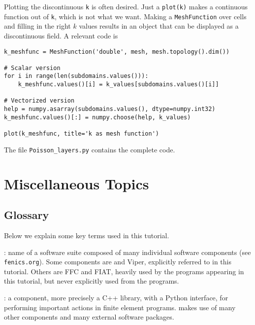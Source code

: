 Plotting the discontinuous {\fontsize{12pt}{12pt}\texttt{k}} is often desired. Just a {\fontsize{12pt}{12pt}\texttt{plot(k)}}
makes a continuous function out of {\fontsize{12pt}{12pt}\texttt{k}}, which is not what we want.
Making a {\fontsize{12pt}{12pt}\texttt{MeshFunction}} over cells and filling in the right $k$
values results in an object that can be displayed as a discontinuous field.
A relevant code is
\begin{Verbatim}[fontsize=\fontsize{10pt}{10pt},tabsize=8,baselinestretch=1.05,
fontfamily=tt,xleftmargin=7mm]
k_meshfunc = MeshFunction('double', mesh, mesh.topology().dim())

# Scalar version
for i in range(len(subdomains.values())):
    k_meshfunc.values()[i] = k_values[subdomains.values()[i]]

# Vectorized version
help = numpy.asarray(subdomains.values(), dtype=numpy.int32)
k_meshfunc.values()[:] = numpy.choose(help, k_values)

plot(k_meshfunc, title='k as mesh function')
\end{Verbatim}
\noindent
The file {\fontsize{12pt}{12pt}\verb!Poisson_layers.py!} contains the complete code.


\section{Miscellaneous Topics}

\subsection{Glossary}

\newcommand{\gln}{\vspace{2mm}\par}

Below we explain some key terms used in this tutorial.

\fenics: name of a software suite composed of many individual software
components (see {\fontsize{12pt}{12pt}\texttt{fenics.org}}). Some components are \dolfin{} and
Viper, explicitly referred to in this tutorial. Others are
FFC and FIAT, heavily used by the programs appearing in this tutorial,
but never explicitly used from the programs.\gln

\dolfin: a \fenics{} component, more precisely a C++ library, with
a Python interface, for performing important actions in finite element
programs. \dolfin{} makes use of many other \fenics{} components and
many external software packages.\gln

